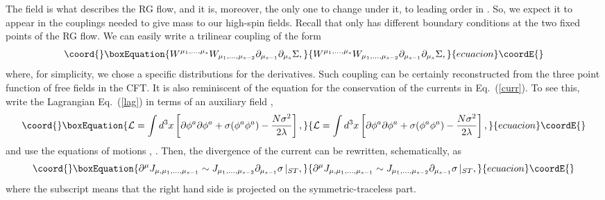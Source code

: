 \documentclass[a4paper,12pt]{article}
\begin{document}
The field \myHighlight{$\Sigma$}\coordHE{} is what describes the RG flow, and it is, moreover,
the only one to change under it, to leading order in \coordHE{}. So, we
expect it to appear in the couplings needed to give mass to our
high-spin fields.  Recall that \myHighlight{$\Sigma$}\coordHE{} only has different boundary
conditions at the two fixed points of the RG flow.  We can easily
write a trilinear coupling of the form
\begin{equation}\coord{}\boxEquation{
W^{\mu_1,...,\mu_s}W_{\mu_1,...,\mu_{s-2}}\partial_{\mu_{s-1}}\partial_{\mu_s}
\Sigma,
\label{trilinear}
}{
W^{\mu_1,...,\mu_s}W_{\mu_1,...,\mu_{s-2}}\partial_{\mu_{s-1}}\partial_{\mu_s}
\Sigma,
}{ecuacion}\coordE{}\end{equation}
where, for simplicity, we chose a specific distributions for the
derivatives.  Such coupling can be certainly reconstructed from the
three point function of free fields in the CFT. It is also reminiscent
of the equation for the conservation of the currents in
Eq.~(\ref{curr}). To see this, write the Lagrangian Eq.~(\ref{lag}) in
terms of an auxiliary field \myHighlight{$\sigma$}\coordHE{},
\begin{equation}\coord{}\boxEquation{
{\cal L}=\int d^3x \left[\partial \phi^a \partial \phi^a +\sigma (\phi^a
\phi^a) - {N \sigma^2\over 2\lambda} \right],
\label{lag2}
}{
{\cal L}=\int d^3x \left[\partial \phi^a \partial \phi^a +\sigma (\phi^a
\phi^a) - {N \sigma^2\over 2\lambda} \right],
}{ecuacion}\coordE{}\end{equation}
and use the equations of motions \coordHE{},
\coordHE{}. Then, the divergence of the current can be 
rewritten, schematically, as 
\begin{equation}\coord{}\boxEquation{
\partial^\mu J_{\mu,\mu_1,...,\mu_{s-1}}\sim 
J_{\mu_1,...,\mu_{s-2}}\partial_{\mu_{s-1}}\sigma \, |_{ST},
\label{noncons}
}{
\partial^\mu J_{\mu,\mu_1,...,\mu_{s-1}}\sim 
J_{\mu_1,...,\mu_{s-2}}\partial_{\mu_{s-1}}\sigma \, |_{ST},
}{ecuacion}\coordE{}\end{equation}
where the subscript means that the right hand side is projected on
the symmetric-traceless part. 
\end{document}
